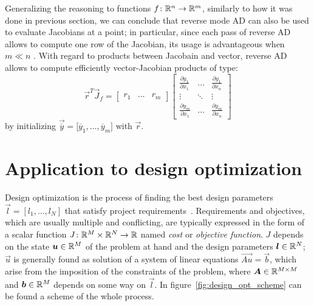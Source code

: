 Generalizing the reasoning to functions $f \colon \mathbb{R}^n \to \mathbb{R}^m$, similarly to how it was done in previous section, we can conclude that reverse mode AD can also be used to evaluate Jacobians at a point; in particular, since each pass of reverse AD allows to compute one row of the Jacobian, its usage is advantageous when $m \ll n$ .
With regard to products between Jacobain and vector, reverse AD allows to compute efficiently vector-Jacobian products of type:
\begin{equation}
	\vec{r}^T \vec{J}_f =
	\begin{bmatrix}
		r_1 	& \dots  & r_m
	\end{bmatrix}
	\begin{bmatrix}
		\frac{\partial y_1}{\partial x_1} &  \dots  & \frac{\partial y_1}{\partial x_n}  \\
		\vdots							  & \ddots  & \vdots							 \\
		\frac{\partial y_m}{\partial x_1} &  \dots  & \frac{\partial y_m}{\partial x_n}
	\end{bmatrix}
\end{equation}
by initializing $\vec{\overline{y}}=\big[\overline{y}_1, \dots, \overline{y}_m \big]$ with $\vec{r}$.




\section{Application to design optimization}
\label{sec:application_to_design_opt}

Design optimization is the process of finding the best design parameters $\vec{l} = [l_1, \dots, l_N]$ that satisfy project requirements~\cite{Matlab:design_opt}. Requirements and objectives, which are usually multiple and conflicting, are typically expressed in the form of a scalar function $J \colon \mathbb{R}^M\times\mathbb{R}^N \to \mathbb{R}$ named \emph{cost} or \emph{objective function}. $J$ depends on the state $\boldsymbol{u} \in \mathbb{R}^M$ of the problem at hand and the design parameters $\boldsymbol{l} \in \mathbb{R}^N$; $\vec{u}$ is generally found as solution of a system of linear equations $\vec{Au} = \vec{b}$, which arise from the imposition of the constraints of the problem, where $\boldsymbol{A} \in \mathbb{R}^{M \times M}$ and $\boldsymbol{b} \in \mathbb{R}^M$ depends on some way on $\vec{l}$. In figure~\ref{fig:design_opt_scheme} can be found a scheme of the whole process.

